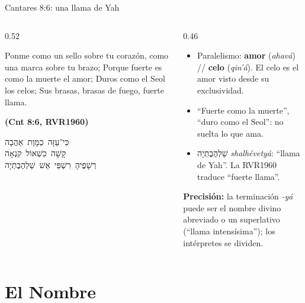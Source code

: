 \documentclass[hyperref={bookmarks=false},aspectratio=169]{beamer}
\newcommand{\heb}[1]{\mbox{\foreignlanguage{hebrew}{#1}}}
\newcommand{\fuente}[1]{\par\hfill{\upshape\bfseries\footnotesize\textcolor{azul}{#1}}}
\newcommand{\destacar}[1]{\textbf{\textcolor{azul}{#1}}}
\newcommand{\precision}[1]{{\footnotesize\color{gris}\textbf{Precisión:} #1}}
\begin{document}
\begin{frame}{Cantares 8:6: una llama de Yah}
\begin{columns}[c,onlytextwidth]
\begin{column}{0.52\textwidth}
\begin{cita}Ponme como un sello sobre tu corazón, como una marca sobre tu brazo; Porque fuerte es como la muerte el amor; Duros como el Seol los celos; Sus brasas, brasas de fuego, fuerte llama.\fuente{(Cnt 8:6, RVR1960)}\end{cita}
\begin{center}\heb{כִּי־עַזָּה כַמָּוֶת אַהֲבָה}\\[2pt]\heb{קָשָׁה כִשְׁאוֹל קִנְאָה}\\[2pt]\heb{רְשָׁפֶיהָ רִשְׁפֵּי אֵשׁ שַׁלְהֶבֶתְיָה}\end{center}
\end{column}
\begin{column}{0.46\textwidth}\small
\begin{itemize}
\item Paralelismo: \destacar{amor} (\emph{ahavá}) // \destacar{celo} (\emph{qin'á}). El celo es el amor visto desde su exclusividad.
\item ``Fuerte como la muerte'', ``duro como el Seol'': no suelta lo que ama.
\item \heb{שַׁלְהֶבֶתְיָה} \emph{shalhévetyá}: ``llama de Yah''. La RVR1960 traduce ``fuerte llama''.
\end{itemize}
\precision{la terminación \emph{-yá} puede ser el nombre divino abreviado o un superlativo (``llama intensísima''); los intérpretes se dividen.}
\end{column}
\end{columns}
\end{frame}

\section{El Nombre}
\end{document}
